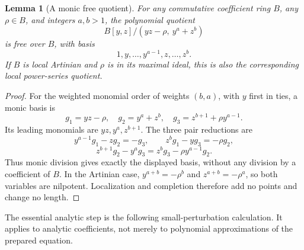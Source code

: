 \documentclass[11pt]{article}
\newtheorem{lemma}{Lemma}
\begin{document}
\begin{lemma}[A monic free quotient]\label{lem:free}
For any commutative coefficient ring \(B\), any \(\rho\in B\), and
integers \(a,b>1\), the polynomial quotient
\[
 B[y,z]/(yz-\rho,\ y^a+z^b)
\]
is free over \(B\), with basis
\[
 1,y,\ldots,y^{a-1},z,\ldots,z^b.
\]
If \(B\) is local Artinian and \(\rho\) is in its maximal ideal,
this is also the corresponding local power-series quotient.
\end{lemma}
\begin{proof}
For the weighted monomial order of weights \((b,a)\), with \(y\)
first in ties, a monic basis is
\[
 g_1=yz-\rho,\quad g_2=y^a+z^b,\quad
 g_3=z^{b+1}+\rho y^{a-1}.
\]
Its leading monomials are \(yz,y^a,z^{b+1}\).
The three pair reductions are
\[
 y^{a-1}g_1-zg_2=-g_3,\qquad
 z^bg_1-yg_3=-\rho g_2,
\]
\[
 z^{b+1}g_2-y^ag_3=z^bg_3-\rho y^{a-1}g_2.
\]
Thus monic division gives exactly the displayed basis, without any
division by a coefficient of \(B\).
In the Artinian case,
\(y^{a+b}=-\rho^b\) and \(z^{a+b}=-\rho^a\), so both variables
are nilpotent.  Localization and completion therefore add no points
and change no length.
\end{proof}

The essential analytic step is the following small-perturbation
calculation.  It applies to analytic coefficients, not merely to
polynomial approximations of the prepared equation.
\end{document}
